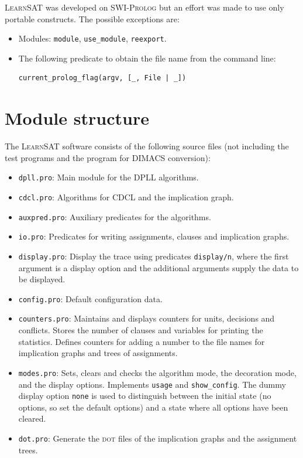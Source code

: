 \documentclass[11pt]{article}
\newcommand*{\p}[1]{\textup{\texttt{#1}}}
\newcommand*{\ls}{\textsc{LearnSAT}}
\newcommand*{\sw}{\textsc{SWI-Prolog}}
\newcommand*{\dt}{\textsc{dot}}
\begin{document}
\ls{} was developed on \sw{} but an effort was made to use only portable
constructs. The possible exceptions are:

\begin{itemize}
\item Modules: \p{module}, \p{use\_module}, \p{reexport}.
\item The following predicate to obtain the file name from the command
line:
\begin{verbatim}
current_prolog_flag(argv, [_, File | _])
\end{verbatim}
\end{itemize}

\newpage


\section{Module structure}

The \ls{} software consists of the following source files (not including
the test programs and the program for DIMACS conversion):

\begin{itemize}
\item \p{dpll.pro}: Main module for the DPLL algorithms.

\item \p{cdcl.pro}: Algorithms for CDCL and the implication graph.

\item \p{auxpred.pro}: Auxiliary predicates for the algorithms. 

\item \p{io.pro}: Predicates for writing assignments, clauses and
implication graphs.

\item \p{display.pro}: Display the trace using predicates \p{display/n},
where the first argument is a display option and the additional
arguments supply the data to be displayed.

\item \p{config.pro}: Default configuration data.

\item \p{counters.pro}: Maintains and displays counters for units,
decisions and conflicts. Stores the number of clauses and variables for
printing the statistics. Defines counters for adding a number to the
file names for implication graphs and trees of assignments.

\item \p{modes.pro}: Sets, clears and checks the algorithm mode, the
decoration mode, and the display options. Implements \p{usage} and
\p{show\_config}. The dummy display option \p{none} is used to
distinguish between the initial state (no options, so set the default
options) and a state where all options have been cleared.

\item \p{dot.pro}: Generate the \dt{} files of the implication graphs
and the assignment trees.
\end{itemize}
\end{document}
